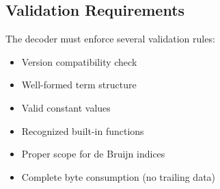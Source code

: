 \documentclass[../midgard.tex]{subfiles}
\begin{document}
\subsection{Validation Requirements}

The decoder must enforce several validation rules:

\begin{itemize}
    \item Version compatibility check
    \item Well-formed term structure
    \item Valid constant values
    \item Recognized built-in functions
    \item Proper scope for de Bruijn indices
    \item Complete byte consumption (no trailing data)
\end{itemize}
\end{document}
